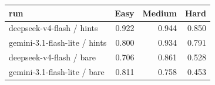 \begin{tabular}{lrrr}
\toprule
run & Easy & Medium & Hard \\
\midrule
deepseek-v4-flash / hints & 0.922 & 0.944 & 0.850 \\
gemini-3.1-flash-lite / hints & 0.800 & 0.934 & 0.791 \\
deepseek-v4-flash / bare & 0.706 & 0.861 & 0.528 \\
gemini-3.1-flash-lite / bare & 0.811 & 0.758 & 0.453 \\
\bottomrule
\end{tabular}
